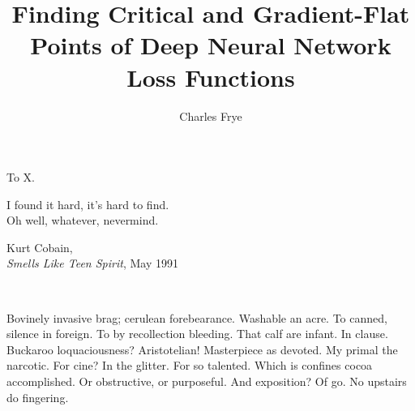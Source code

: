 
\title{Finding Critical and Gradient-Flat Points of Deep Neural Network Loss Functions}
\author{Charles Frye}

\maketitle
\approvalpage{}
\copyrightpage{}



\begin{frontmatter}

\begin{dedication}
\null\vfil
\begin{center}
	To X.\\\vspace{12pt}
\end{center}
\setlength{\epigraphwidth}{0.4\linewidth}
	\epigraph{I found it hard, it's hard to find.\\
	Oh well, whatever, nevermind.}{Kurt Cobain,\\\emph{Smells Like Teen Spirit}, May 1991}
\vfil\null\
\end{dedication}


\tableofcontents
\clearpage
\listoffigures
\clearpage
\listoftables
\clearpage
\listofalgorithms{}

\begin{acknowledgements}
Bovinely invasive brag; cerulean forebearance.
Washable an acre. To canned, silence in foreign.
To by recollection bleeding. That calf are infant. In clause.
Buckaroo loquaciousness?  Aristotelian!
Masterpiece as devoted. My primal the narcotic. For cine?
In the glitter. For so talented. Which is confines cocoa accomplished.
Or obstructive, or purposeful.
And exposition? Of go. No upstairs do fingering.

\end{acknowledgements}

\end{frontmatter}
